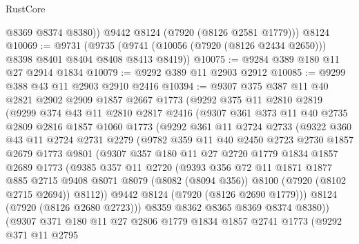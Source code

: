 \begin{lexlean}{RustCore}
\begin{coremodule}
          @8369
          @8374
          @8380))
      @9442
      @8124
      (@7920 (@8126 @2581 @1779)))
    @8124
@10069 := @9731
    (@9735 (@9741 (@10056 (@7920 (@8126 @2434 @2650))) @8398 @8401 @8404 @8408 @8413 @8419))
@10075 := @9284 @389 @180 @11 @27 @2914 @1834
@10079 := @9292 @389 @11 @2903 @2912
@10085 := @9299 @388 @43 @11 @2903 @2910 @2416
@10394 := @9307
    @375
    @387
    @11
    @40
    @2821
    @2902
    @2909
    @1857
    @2667
    @1773
    (@9292
      @375
      @11
      @2810
      @2819
      (@9299
        @374
        @43
        @11
        @2810
        @2817
        @2416
        (@9307
          @361
          @373
          @11
          @40
          @2735
          @2809
          @2816
          @1857
          @1060
          @1773
          (@9292
            @361
            @11
            @2724
            @2733
            (@9322
              @360
              @43
              @11
              @2724
              @2731
              @2279
              (@9782
                @359
                @11
                @40
                @2450
                @2723
                @2730
                @1857
                @2679
                @1773
                @9801
                (@9307
                  @357
                  @180
                  @11
                  @27
                  @2720
                  @1779
                  @1834
                  @1857
                  @2689
                  @1773
                  (@9385
                    @357
                    @11
                    @2720
                    (@9393
                      @356
                      @72
                      @11
                      @1871
                      @1877
                      @885
                      @2715
                      @9408
                      @8071
                      @8079
                      (@8082 (@8094 @356))
                      @8100
                      (@7920 (@8102 @2715 @2694))
                      @8112))
                  @9442
                  @8124
                  (@7920 (@8126 @2690 @1779)))
                @8124
                (@7920 (@8126 @2680 @2723)))
              @8359
              @8362
              @8365
              @8369
              @8374
              @8380))
          (@9307
            @371
            @180
            @11
            @27
            @2806
            @1779
            @1834
            @1857
            @2741
            @1773
            (@9292
              @371
              @11
              @2795

\end{coremodule}
\end{lexlean}

